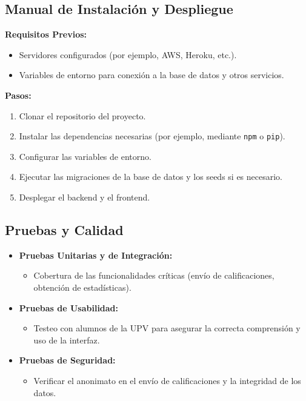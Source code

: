 \documentclass[11pt]{article}
\begin{document}
\subsection{Manual de Instalación y Despliegue}
\textbf{Requisitos Previos:}
\begin{itemize}
    \item Servidores configurados (por ejemplo, AWS, Heroku, etc.).
    \item Variables de entorno para conexión a la base de datos y otros servicios.
\end{itemize}
\textbf{Pasos:}
\begin{enumerate}
    \item Clonar el repositorio del proyecto.
    \item Instalar las dependencias necesarias (por ejemplo, mediante \texttt{npm} o \texttt{pip}).
    \item Configurar las variables de entorno.
    \item Ejecutar las migraciones de la base de datos y los seeds si es necesario.
    \item Desplegar el backend y el frontend.
\end{enumerate}

\subsection{Pruebas y Calidad}
\begin{itemize}
    \item \textbf{Pruebas Unitarias y de Integración:}
    \begin{itemize}
        \item Cobertura de las funcionalidades críticas (envío de calificaciones, obtención de estadísticas).
    \end{itemize}
    \item \textbf{Pruebas de Usabilidad:}
    \begin{itemize}
        \item Testeo con alumnos de la UPV para asegurar la correcta comprensión y uso de la interfaz.
    \end{itemize}
    \item \textbf{Pruebas de Seguridad:}
    \begin{itemize}
        \item Verificar el anonimato en el envío de calificaciones y la integridad de los datos.
    \end{itemize}
\end{itemize}
\end{document}
